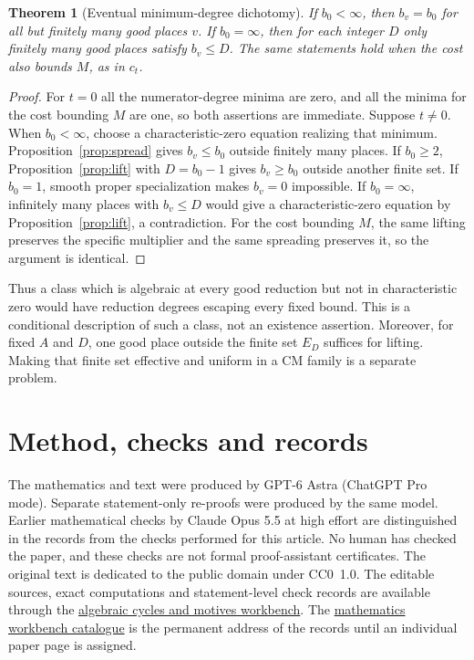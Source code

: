 \documentclass[11pt]{article}
\newtheorem{theorem}{Theorem}[section]
\theoremstyle{definition}
\theoremstyle{remark}
\newcommand{\workbenchurl}{https://github.com/KokunoYumeto/algebraic-cycles-and-motives-workbench}
\newcommand{\recordurl}{https://github.com/KokunoYumeto/mathematics-workbenches}
\begin{document}
\begin{theorem}[Eventual minimum-degree dichotomy]\label{thm:ghosts}
If $b_0<\infty$, then $b_v=b_0$ for all but finitely many good places $v$. If $b_0=\infty$, then for each integer $D$ only finitely many good places satisfy $b_v\leq D$. The same statements hold when the cost also bounds $M$, as in $c_t$.
\end{theorem}

\begin{proof}
For $t=0$ all the numerator-degree minima are zero, and all the minima for the cost bounding $M$ are one, so both assertions are immediate. Suppose $t\ne0$. When $b_0<\infty$, choose a characteristic-zero equation realizing that minimum. Proposition~\ref{prop:spread} gives $b_v\leq b_0$ outside finitely many places. If $b_0\geq2$, Proposition~\ref{prop:lift} with $D=b_0-1$ gives $b_v\geq b_0$ outside another finite set. If $b_0=1$, smooth proper specialization makes $b_v=0$ impossible. If $b_0=\infty$, infinitely many places with $b_v\leq D$ would give a characteristic-zero equation by Proposition~\ref{prop:lift}, a contradiction. For the cost bounding $M$, the same lifting preserves the specific multiplier and the same spreading preserves it, so the argument is identical.
\end{proof}

Thus a class which is algebraic at every good reduction but not in characteristic zero would have reduction degrees escaping every fixed bound. This is a conditional description of such a class, not an existence assertion. Moreover, for fixed $A$ and $D$, one good place outside the finite set $E_D$ suffices for lifting. Making that finite set effective and uniform in a CM family is a separate problem.









\section*{Method, checks and records}
The mathematics and text were produced by GPT-6 Astra (ChatGPT Pro mode). Separate statement-only re-proofs were produced by the same model. Earlier mathematical checks by Claude Opus 5.5 at high effort are distinguished in the records from the checks performed for this article. No human has checked the paper, and these checks are not formal proof-assistant certificates. The original text is dedicated to the public domain under CC0~1.0. The editable sources, exact computations and statement-level check records are available through the \href{\workbenchurl}{algebraic cycles and motives workbench}. The \href{\recordurl}{mathematics workbench catalogue} is the permanent address of the records until an individual paper page is assigned.


\end{document}
